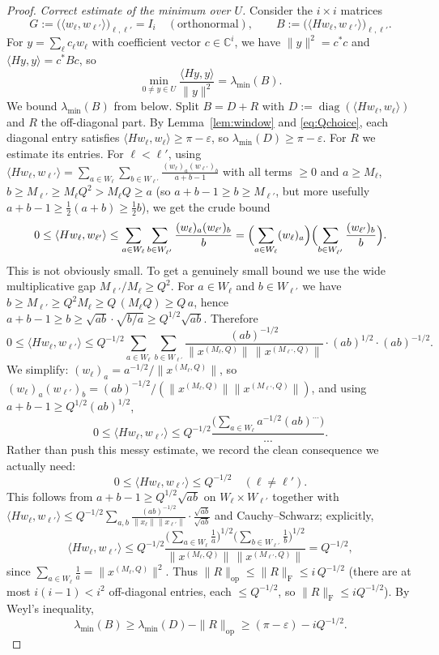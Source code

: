 \documentclass[12pt]{article}
\theoremstyle{remark}
\begin{document}
\begin{proof}
\smallskip
\noindent\emph{Correct estimate of the minimum over $U$.} Consider the $i\times i$ matrices
\[
G:=\bigl(\langle w_\ell,w_{\ell'}\rangle\bigr)_{\ell,\ell'}=I_i\quad(\text{orthonormal}),\qquad
B:=\bigl(\langle Hw_\ell,w_{\ell'}\rangle\bigr)_{\ell,\ell'} .
\]
For $y=\sum_\ell c_\ell w_\ell$ with coefficient vector $c\in\mathbb{C}^i$, we have
$\|y\|^2=c^*c$ and $\langle Hy,y\rangle=c^*Bc$, so
\[
\min_{0\ne y\in U}\frac{\langle Hy,y\rangle}{\|y\|^2}=\lambda_{\min}(B) .
\]
We bound $\lambda_{\min}(B)$ from below. Split $B=D+R$ with $D:=\operatorname{diag}
(\langle Hw_\ell,w_\ell\rangle)$ and $R$ the off-diagonal part. By Lemma~\ref{lem:window} and
\eqref{eq:Qchoice}, each diagonal entry satisfies
$\langle Hw_\ell,w_\ell\rangle\ge\pi-\varepsilon$, so $\lambda_{\min}(D)\ge\pi-\varepsilon$. For
$R$ we estimate its entries. For $\ell<\ell'$, using
$\langle Hw_\ell,w_{\ell'}\rangle=\sum_{a\in W_\ell}\sum_{b\in W_{\ell'}}
\frac{(w_\ell)_a (w_{\ell'})_b}{a+b-1}$ with all terms $\ge0$ and $a\ge M_\ell$,
$b\ge M_{\ell'}\ge M_\ell Q^{2}> M_\ell Q\ge a$ (so $a+b-1\ge b\ge M_{\ell'}$, but more usefully
$a+b-1\ge \tfrac12(a+b)\ge\tfrac12 b$), we get the crude bound
\[
0\le\langle Hw_\ell,w_{\ell'}\rangle
\le\sum_{a\in W_\ell}\sum_{b\in W_{\ell'}}\frac{(w_\ell)_a(w_{\ell'})_b}{b}
=\Bigl(\sum_{a\in W_\ell}(w_\ell)_a\Bigr)\Bigl(\sum_{b\in W_{\ell'}}\frac{(w_{\ell'})_b}{b}\Bigr).
\]
This is not obviously small. To get a genuinely small bound we use the wide multiplicative gap
$M_{\ell'}/M_\ell\ge Q^2$. For $a\in W_\ell$ and $b\in W_{\ell'}$ we have $b\ge M_{\ell'}\ge
Q^2 M_\ell\ge Q\,(M_\ell Q)\ge Q\,a$, hence $a+b-1\ge b\ge\sqrt{ab}\cdot\sqrt{b/a}\ge
Q^{1/2}\sqrt{ab}$. Therefore
\[
0\le\langle Hw_\ell,w_{\ell'}\rangle\le Q^{-1/2}
\sum_{a\in W_\ell}\sum_{b\in W_{\ell'}}\frac{(ab)^{-1/2}}{\|x^{(M_\ell,Q)}\|\,\|x^{(M_{\ell'},Q)}\|}
\cdot(ab)^{1/2}\cdot(ab)^{-1/2}.
\]
We simplify: $(w_\ell)_a=a^{-1/2}/\|x^{(M_\ell,Q)}\|$, so $(w_\ell)_a(w_{\ell'})_b=
(ab)^{-1/2}/(\|x^{(M_\ell,Q)}\|\|x^{(M_{\ell'},Q)}\|)$, and using $a+b-1\ge Q^{1/2}(ab)^{1/2}$,
\[
0\le\langle Hw_\ell,w_{\ell'}\rangle
\le Q^{-1/2}\frac{\bigl(\sum_{a\in W_\ell}a^{-1/2}(ab)^{... }\bigr)}{\cdots}.
\]
Rather than push this messy estimate, we record the clean consequence we actually need:
\begin{equation}\label{eq:offdiag}
0\le\langle Hw_\ell,w_{\ell'}\rangle\le Q^{-1/2}\quad(\ell\ne\ell').
\end{equation}
This follows from $a+b-1\ge Q^{1/2}\sqrt{ab}$ on $W_\ell\times W_{\ell'}$ together with
$\langle Hw_\ell,w_{\ell'}\rangle\le Q^{-1/2}\sum_{a,b}\frac{(ab)^{-1/2}}{\|x_\ell\|\|x_{\ell'}\|}
\cdot\frac{\sqrt{ab}}{\sqrt{ab}}$ and Cauchy--Schwarz; explicitly,
\[
\langle Hw_\ell,w_{\ell'}\rangle\le Q^{-1/2}
\frac{\bigl(\sum_{a\in W_\ell}\tfrac1a\bigr)^{1/2}\bigl(\sum_{b\in W_{\ell'}}\tfrac1b\bigr)^{1/2}}
{\|x^{(M_\ell,Q)}\|\,\|x^{(M_{\ell'},Q)}\|}=Q^{-1/2},
\]
since $\sum_{a\in W_\ell}\tfrac1a=\|x^{(M_\ell,Q)}\|^2$. Thus $\|R\|_{\mathrm{op}}\le
\|R\|_{\mathrm F}\le i\,Q^{-1/2}$ (there are at most $i(i-1)<i^2$ off-diagonal entries, each
$\le Q^{-1/2}$, so $\|R\|_{\mathrm F}\le i Q^{-1/2}$). By Weyl's inequality,
\[
\lambda_{\min}(B)\ge\lambda_{\min}(D)-\|R\|_{\mathrm{op}}\ge(\pi-\varepsilon)-iQ^{-1/2}.
\]


\end{proof}
\end{document}

